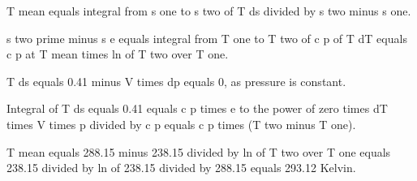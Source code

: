 T mean equals integral from s one to s two of T ds divided by s two minus s one.

s two prime minus s e equals integral from T one to T two of c p of T dT equals c p at T mean times ln of T two over T one.

T ds equals 0.41 minus V times dp equals 0, as pressure is constant.

Integral of T ds equals 0.41 equals c p times e to the power of zero times dT times V times p divided by c p equals c p times (T two minus T one).

T mean equals 288.15 minus 238.15 divided by ln of T two over T one equals 238.15 divided by ln of 238.15 divided by 288.15 equals 293.12 Kelvin.
